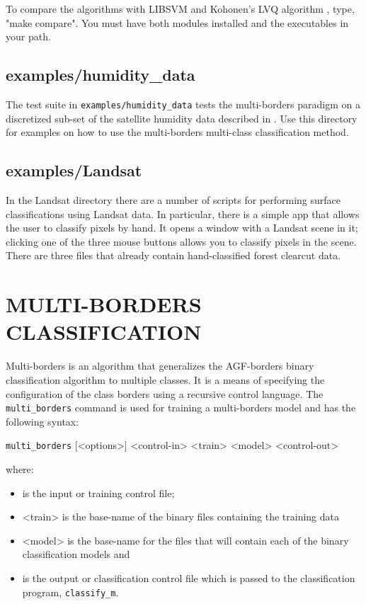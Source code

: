 \documentclass[12pt]{article}
\begin{document}
  To compare the algorithms with LIBSVM \citep{Chang_Lin2011} and Kohonen's LVQ algorithm \citep{Kohonen2000}, type, "make compare".  You must have both modules installed and the executables in your path.

\subsection{examples/humidity\_data}

The test suite in \verb"examples/humidity_data" tests the multi-borders paradigm on a discretized sub-set of the satellite humidity data described in \citet{Mills2009}.  Use this directory for examples on how to use the multi-borders multi-class classification method.

\subsection{examples/Landsat}

In the Landsat directory there are a number of scripts for performing surface classifications using Landsat data.  In particular, there is a simple app that allows the user to classify pixels by hand.  It opens a window with a Landsat scene in it; clicking one of the three mouse buttons allows you to classify pixels in the scene.  There are three files that already contain hand-classified forest clearcut data.


\section{MULTI-BORDERS CLASSIFICATION}

\label{MULTI_BORDERS_CLASSIFICATION}

  Multi-borders is an algorithm that generalizes the AGF-borders binary classification algorithm to multiple classes.  It is a means of specifying the configuration of the class borders using a recursive control language.  The \verb/multi_borders/ command is used for training a multi-borders model and has the following syntax:

  \verb/multi_borders/ [<options>] <control-in> <train> <model> <control-out>

where:
\begin{itemize}
\item <control-in> is the input or training control file; 
\item <train> is the base-name of the binary files containing the training data
\item <model> is the base-name for the files that will contain each of the binary classification models and 
\item <control-out> is the output or classification control file which is passed to the classification program, \verb/classify_m/.
\end{itemize}
\end{document}
